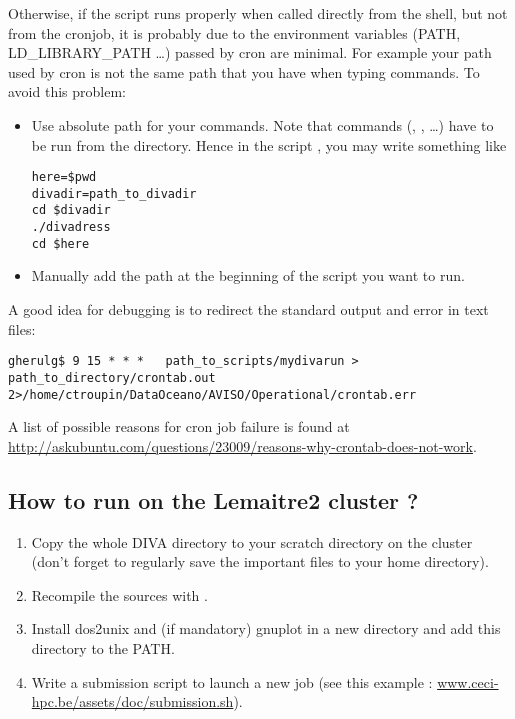 Otherwise, if the script runs properly when called directly from the shell, but not from the cronjob, it is probably due to the environment variables (PATH, LD\_LIBRARY\_PATH \ldots) passed by cron are minimal. For example your path used by cron is not the same path that you have when typing commands. To avoid this problem:
\begin{itemize}
\item Use absolute path for your commands. Note that \diva commands (, , \ldots) have to be run from the  directory. Hence in the script , you may write something like
\begin{lstlisting}[style=Bash]
here=$pwd
divadir=path_to_divadir
cd $divadir
./divadress
cd $here
\end{lstlisting}
\item Manually add the path at the beginning of the script you want to run.
\end{itemize}

A good idea for debugging is to redirect the standard output and error in text files:
\begin{lstlisting}[style=Bash]
gherulg$ 9 15 * * *   path_to_scripts/mydivarun > path_to_directory/crontab.out 2>/home/ctroupin/DataOceano/AVISO/Operational/crontab.err
\end{lstlisting}

A list of possible reasons for cron job failure is found at\\
\url{http://askubuntu.com/questions/23009/reasons-why-crontab-does-not-work}.

\subsection{How to run \diva on the Lemaitre2 cluster ?}

\begin{enumerate}
 \item Copy the whole DIVA directory to your scratch directory on the cluster (don't forget to regularly save the important files to your home directory). 
 \item Recompile the sources with .
 \item Install dos2unix and (if mandatory) gnuplot in a new directory  and add this directory to the \textdollar PATH.
 \item Write a submission script to launch a new job (see this example : \url{www.ceci-hpc.be/assets/doc/submission.sh}).
 
\end{enumerate}

